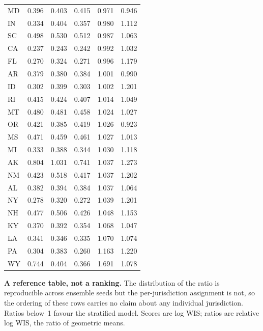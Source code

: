 \begin{longtable}{@{}lrrrrr@{}}
MD & 0.396 & 0.403 & 0.415 & 0.971 & 0.946 \\
IN & 0.334 & 0.404 & 0.357 & 0.980 & 1.112 \\
SC & 0.498 & 0.530 & 0.512 & 0.987 & 1.063 \\
CA & 0.237 & 0.243 & 0.242 & 0.992 & 1.032 \\
FL & 0.270 & 0.324 & 0.271 & 0.996 & 1.179 \\
AR & 0.379 & 0.380 & 0.384 & 1.001 & 0.990 \\
ID & 0.302 & 0.399 & 0.303 & 1.002 & 1.201 \\
RI & 0.415 & 0.424 & 0.407 & 1.014 & 1.049 \\
MT & 0.480 & 0.481 & 0.458 & 1.024 & 1.027 \\
OR & 0.421 & 0.385 & 0.419 & 1.026 & 0.923 \\
MS & 0.471 & 0.459 & 0.461 & 1.027 & 1.013 \\
MI & 0.333 & 0.388 & 0.344 & 1.030 & 1.118 \\
AK & 0.804 & 1.031 & 0.741 & 1.037 & 1.273 \\
NM & 0.423 & 0.518 & 0.417 & 1.037 & 1.202 \\
AL & 0.382 & 0.394 & 0.384 & 1.037 & 1.064 \\
NY & 0.278 & 0.320 & 0.272 & 1.039 & 1.201 \\
NH & 0.477 & 0.506 & 0.426 & 1.048 & 1.153 \\
KY & 0.370 & 0.392 & 0.354 & 1.068 & 1.047 \\
LA & 0.341 & 0.346 & 0.335 & 1.070 & 1.074 \\
PA & 0.304 & 0.383 & 0.260 & 1.163 & 1.220 \\
WY & 0.744 & 0.404 & 0.366 & 1.691 & 1.078 \\
\end{longtable}
{\raggedright\scriptsize \textbf{A reference table, not a ranking.} The distribution of the ratio is reproducible across ensemble seeds but the per-jurisdiction assignment is not, so the ordering of these rows carries no claim about any individual jurisdiction. Ratios below~1 favour the stratified model. Scores are log WIS; ratios are relative log WIS, the ratio of geometric means.\par}
\endgroup
